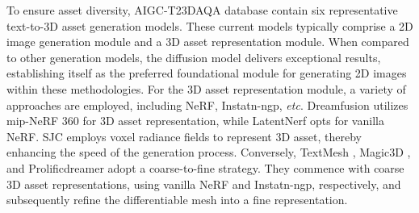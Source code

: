 To ensure asset diversity, AIGC-T23DAQA database contain six representative text-to-3D asset generation models. These current models typically comprise a 2D image generation module and a 3D asset representation module. When compared to other generation models, the diffusion model delivers exceptional results, establishing itself as the preferred foundational module for generating 2D images within these methodologies. For the 3D asset representation module, a variety of approaches are employed, including NeRF, Instatn-ngp, \textit{etc}. Dreamfusion \cite{poole2022dreamfusion} utilizes mip-NeRF 360 for 3D asset representation, while LatentNerf \cite{metzer2023latent} opts for vanilla NeRF. SJC \cite{wang2023score} employs voxel radiance fields to represent 3D asset, thereby enhancing the speed of the generation process. Conversely, TextMesh  \cite{tsalicoglou2023textmesh}, Magic3D \cite{lin2023magic3d}, and Prolificdreamer \cite{wang2024prolificdreamer} adopt a coarse-to-fine strategy. They commence with coarse 3D asset representations, using vanilla NeRF and Instatn-ngp, respectively, and subsequently refine the differentiable mesh into a fine representation. 
